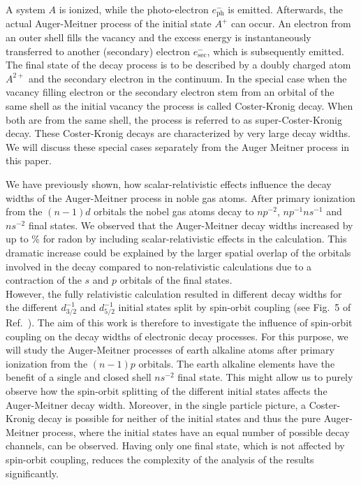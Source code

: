 \documentclass[aps,amssymb,preprint,a4paper,longbibliography]{revtex4}
\begin{document}
A system $A$ is ionized, while the photo-electron $e^-_\text{ph}$ is emitted.      
Afterwards, the actual Auger-Meitner
process of the initial state $A^+$ can occur.    
An electron from an outer                                       
shell fills the vacancy and the excess energy is instantaneously transferred  
to another (secondary) electron $e^-_\text{sec}$, which
is subsequently emitted. The final state of the decay process   
is to be described by a doubly charged atom $A^{2+}$ and the secondary        
electron in the continuum.
{In the special case when the vacancy filling electron or the secondary
electron stem from an orbital
of the same shell as the initial vacancy the process is called Coster-Kronig decay.
When both are from the same shell, the process is referred to as super-Coster-Kronig
decay. These Coster-Kronig decays are characterized by very large decay widths.
\cite{Coster35} We will discuss these special cases separately from the 
Auger Meitner process in this paper.
}

We have previously shown, how
scalar-relativistic effects influence the decay widths of the Auger-Meitner
process in
noble gas atoms. \cite{Fasshauer15_1}
After primary ionization from the $(n-1)d$ orbitals the nobel
gas atoms decay to $np^{-2}$, $np^{-1}ns^{-1}$ and $ns^{-2}$ final states.
We observed that the Auger-Meitner decay widths increased by up to \unit[326]{\%}
for radon
by including scalar-relativistic effects in the calculation. This
dramatic increase could be explained by the larger spatial
overlap of the orbitals
involved in the decay compared to non-relativistic calculations due to
a contraction of the $s$ and $p$ orbitals of the final states.\\
However, the fully relativistic calculation resulted in different decay widths
for the different $d_{3/2}^{-1}$ and $d_{5/2}^{-1}$ initial states split by
spin-orbit coupling (see Fig.~5 of Ref.~\cite{Fasshauer15_1}).
The aim of this work is therefore to investigate the
influence of spin-orbit coupling on the decay widths of electronic decay processes.
For this purpose, we will study the Auger-Meitner processes of earth alkaline atoms
after primary ionization from the $(n-1)p$ orbitals. The earth alkaline elements
have the benefit of a single and closed shell $ns^{-2}$ final state.
This might allow us to purely observe how the spin-orbit splitting of
the different initial states affects the Auger-Meitner decay width.
{
Moreover, in the single particle picture, a Coster-Kronig decay is possible for neither
of the initial states and thus the pure Auger-Meitner process, where the initial
states have an equal number of possible decay channels, can be observed.
}
Having only one final state, which is not affected by spin-orbit coupling,
reduces the complexity of the analysis of the results significantly.
\end{document}
